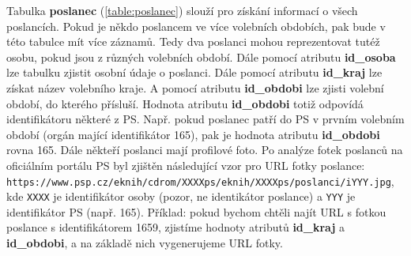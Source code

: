Tabulka \textbf{poslanec} (\ref{table:poslanec}) slouží pro získání informací o všech poslancích. Pokud je někdo poslancem ve více volebních obdobích, pak bude v této tabulce mít více záznamů. Tedy dva poslanci mohou reprezentovat tutéž osobu, pokud jsou z různých volebních období. Dále pomocí atributu \textbf{id\_osoba} lze tabulku zjistit osobní údaje o poslanci. Dále pomocí atributu \textbf{id\_kraj} lze získat název volebního kraje. A pomocí atributu \textbf{id\_obdobi} lze zjisti volební období, do kterého přísluší. Hodnota atributu \textbf{id\_obdobi} totiž odpovídá identifikátoru některé z PS. Např. pokud poslanec patří do PS v prvním volebním období (orgán mající identifikátor 165), pak je hodnota atributu \textbf{id\_obdobi} rovna 165. Dále někteří poslanci mají profilové foto. Po analýze fotek poslanců na oficiálním portálu PS byl zjištěn následující vzor pro URL fotky poslance: \lstinline|https://www.psp.cz/eknih/cdrom/XXXXps/eknih/XXXXps/poslanci/iYYY.jpg|, kde \lstinline|XXXX| je identifikátor osoby (pozor, ne identikátor poslance) a \lstinline|YYY| je identifikátor PS (např. 165). Příklad: pokud bychom chtěli najít URL s fotkou poslance s identifikátorem 1659, zjistíme hodnoty atributů \textbf{id\_kraj} a \textbf{id\_obdobi}, a na základě nich vygenerujeme URL fotky.

